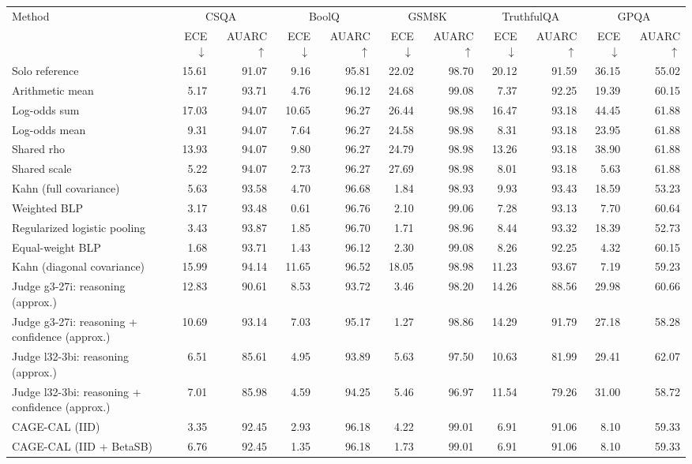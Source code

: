 \begin{tabular}{lrrrrrrrrrr}
\toprule
Method & \multicolumn{2}{c}{CSQA} & \multicolumn{2}{c}{BoolQ} & \multicolumn{2}{c}{GSM8K} & \multicolumn{2}{c}{TruthfulQA} & \multicolumn{2}{c}{GPQA} \\
 & ECE $\downarrow$ & AUARC $\uparrow$ & ECE $\downarrow$ & AUARC $\uparrow$ & ECE $\downarrow$ & AUARC $\uparrow$ & ECE $\downarrow$ & AUARC $\uparrow$ & ECE $\downarrow$ & AUARC $\uparrow$ \\
\midrule
Solo reference & 15.61 & 91.07 & 9.16 & 95.81 & 22.02 & 98.70 & 20.12 & 91.59 & 36.15 & 55.02 \\
Arithmetic mean & 5.17 & 93.71 & 4.76 & 96.12 & 24.68 & 99.08 & 7.37 & 92.25 & 19.39 & 60.15 \\
Log-odds sum & 17.03 & 94.07 & 10.65 & 96.27 & 26.44 & 98.98 & 16.47 & 93.18 & 44.45 & 61.88 \\
Log-odds mean & 9.31 & 94.07 & 7.64 & 96.27 & 24.58 & 98.98 & 8.31 & 93.18 & 23.95 & 61.88 \\
Shared rho & 13.93 & 94.07 & 9.80 & 96.27 & 24.79 & 98.98 & 13.26 & 93.18 & 38.90 & 61.88 \\
Shared scale & 5.22 & 94.07 & 2.73 & 96.27 & 27.69 & 98.98 & 8.01 & 93.18 & 5.63 & 61.88 \\
Kahn (full covariance) & 5.63 & 93.58 & 4.70 & 96.68 & 1.84 & 98.93 & 9.93 & 93.43 & 18.59 & 53.23 \\
Weighted BLP & 3.17 & 93.48 & 0.61 & 96.76 & 2.10 & 99.06 & 7.28 & 93.13 & 7.70 & 60.64 \\
Regularized logistic pooling & 3.43 & 93.87 & 1.85 & 96.70 & 1.71 & 98.96 & 8.44 & 93.32 & 18.39 & 52.73 \\
Equal-weight BLP & 1.68 & 93.71 & 1.43 & 96.12 & 2.30 & 99.08 & 8.26 & 92.25 & 4.32 & 60.15 \\
Kahn (diagonal covariance) & 15.99 & 94.14 & 11.65 & 96.52 & 18.05 & 98.98 & 11.23 & 93.67 & 7.19 & 59.23 \\
Judge g3-27i: reasoning (approx.) & 12.83 & 90.61 & 8.53 & 93.72 & 3.46 & 98.20 & 14.26 & 88.56 & 29.98 & 60.66 \\
Judge g3-27i: reasoning + confidence (approx.) & 10.69 & 93.14 & 7.03 & 95.17 & 1.27 & 98.86 & 14.29 & 91.79 & 27.18 & 58.28 \\
Judge l32-3bi: reasoning (approx.) & 6.51 & 85.61 & 4.95 & 93.89 & 5.63 & 97.50 & 10.63 & 81.99 & 29.41 & 62.07 \\
Judge l32-3bi: reasoning + confidence (approx.) & 7.01 & 85.98 & 4.59 & 94.25 & 5.46 & 96.97 & 11.54 & 79.26 & 31.00 & 58.72 \\
CAGE-CAL (IID) & 3.35 & 92.45 & 2.93 & 96.18 & 4.22 & 99.01 & 6.91 & 91.06 & 8.10 & 59.33 \\
CAGE-CAL (IID + BetaSB) & 6.76 & 92.45 & 1.35 & 96.18 & 1.73 & 99.01 & 6.91 & 91.06 & 8.10 & 59.33 \\
\bottomrule
\end{tabular}
